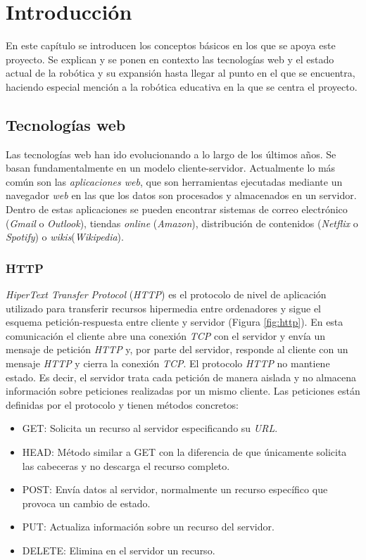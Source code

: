 
\chapter{Introducción}
\label{chap:intro}
En este capítulo se introducen los conceptos básicos en los que se apoya este proyecto. Se explican y se ponen en contexto las tecnologías web y el estado actual de la robótica y su expansión hasta llegar al punto en el que se encuentra, haciendo especial mención a la robótica educativa en la que se centra el proyecto.
   
\section{Tecnologías web}
\label{sec:web}
Las tecnologías web han ido evolucionando a lo largo de los últimos años. Se basan fundamentalmente en un modelo cliente-servidor. Actualmente lo más común son las \textit{aplicaciones web}, que son herramientas ejecutadas mediante un navegador \textit{web} en las que los datos son procesados y almacenados en un servidor. Dentro de estas aplicaciones se pueden encontrar sistemas de correo electrónico (\textit{Gmail}  o \textit{Outlook}), tiendas \textit{online} (\textit{Amazon}), distribución de contenidos (\textit{Netflix} o \textit{Spotify}) o \textit{wikis}(\textit{Wikipedia}).


\subsection{HTTP}
\label{subsec:http}
\textit{HiperText Transfer Protocol} (\textit{HTTP}) es el protocolo de nivel de aplicación utilizado para transferir recursos hipermedia entre ordenadores y sigue el esquema petición-respuesta entre cliente y servidor (Figura \ref{fig:http}). En esta comunicación el cliente abre una conexión \textit{TCP} con el servidor y envía un mensaje de petición \textit{HTTP} y, por parte del servidor, responde al cliente con un mensaje \textit{HTTP} y cierra la conexión \textit{TCP}. 
El protocolo \textit{HTTP} no mantiene estado. Es decir, el servidor trata cada petición de manera aislada y no almacena información sobre peticiones realizadas por un mismo cliente. 
Las peticiones están definidas por el protocolo y tienen métodos concretos: 
\begin{itemize}
    \item GET: Solicita un recurso al servidor especificando su \textit{URL}.
    \item HEAD: Método similar a GET con la diferencia de que únicamente solicita las cabeceras y no descarga el recurso completo.
    \item POST: Envía datos al servidor, normalmente un recurso específico que provoca un cambio de estado. 
    \item PUT: Actualiza información sobre un recurso del servidor. 
    \item DELETE: Elimina en el servidor un recurso.
\end{itemize}

